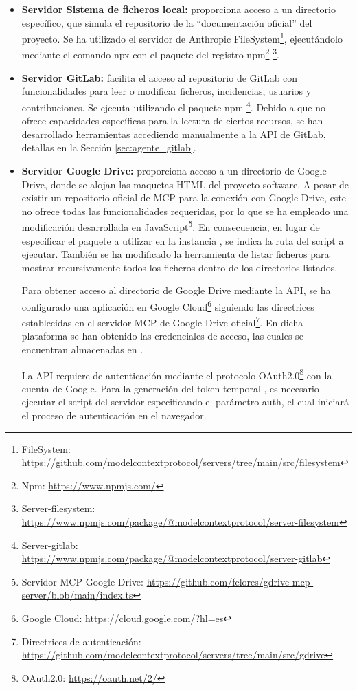 \begin{itemize}
  \item\textbf{Servidor Sistema de ficheros local: }proporciona acceso a un directorio específico, que simula el repositorio de la ``documentación oficial'' del proyecto. Se ha utilizado el servidor de Anthropic FileSystem\footnote{FileSystem: \url{https://github.com/modelcontextprotocol/servers/tree/main/src/filesystem}}, ejecutándolo mediante el comando npx con el paquete del registro npm\footnote{Npm: \url{https://www.npmjs.com/}} \footnote{Server-filesystem: \url{https://www.npmjs.com/package/@modelcontextprotocol/server-filesystem}}.

  \label{sec:gitlab_mcp}
  \item\textbf{Servidor GitLab: }facilita el acceso al repositorio de GitLab con funcionalidades para leer o modificar ficheros, incidencias, usuarios y contribuciones. Se ejecuta utilizando el paquete npm \footnote{Server-gitlab: \url{https://www.npmjs.com/package/@modelcontextprotocol/server-gitlab}}. Debido a que no ofrece capacidades específicas para la lectura de ciertos recursos, se han desarrollado herramientas accediendo manualmente a la API de GitLab, detallas en la Sección \ref{sec:agente_gitlab}.

\item\textbf{Servidor Google Drive: }proporciona acceso a un directorio de Google Drive, donde se alojan las maquetas HTML del proyecto software. A pesar de existir un repositorio oficial de MCP para la conexión con Google Drive, este no ofrece todas las funcionalidades requeridas, por lo que se ha empleado una modificación desarrollada en JavaScript\footnote{Servidor MCP Google Drive: \url{https://github.com/felores/gdrive-mcp-server/blob/main/index.ts}}. En consecuencia, en lugar de especificar el paquete a utilizar en la instancia , se indica la ruta del script a ejecutar. También se ha modificado la herramienta de listar ficheros para mostrar recursivamente todos los ficheros dentro de los directorios listados.

Para obtener acceso al directorio de Google Drive mediante la API, se ha configurado una aplicación en Google Cloud\footnote{Google Cloud: \url{https://cloud.google.com/?hl=es}} siguiendo las directrices establecidas en el servidor MCP de Google Drive oficial\footnote{Directrices de autenticación: \url{https://github.com/modelcontextprotocol/servers/tree/main/src/gdrive}}. En dicha plataforma se han obtenido las credenciales de acceso, las cuales se encuentran almacenadas en .

La API requiere de autenticación mediante el protocolo OAuth2.0\footnote{OAuth2.0: \url{https://oauth.net/2/}} con la cuenta de Google. Para la generación del token temporal , es necesario ejecutar el script del servidor especificando el parámetro auth, el cual iniciará el proceso de autenticación en el navegador.

\end{itemize}

